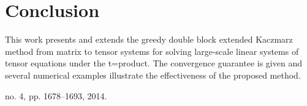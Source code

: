 \documentclass[11pt]{article}
\newtheorem{example}[theorem]{Example}
\def\fm#1{\mathcal{#1}}
\begin{document}






\section{Conclusion}\label{sec:concl}
This work presents and extends the greedy double block extended Kaczmarz method from matrix to tensor  systems for solving large-scale linear systems of tensor equations under the t=product.  The convergence guarantee is given and  several numerical examples illustrate the effectiveness of the proposed method.
 

no. 4, pp. 1678–1693, 2014.
\end{document}
